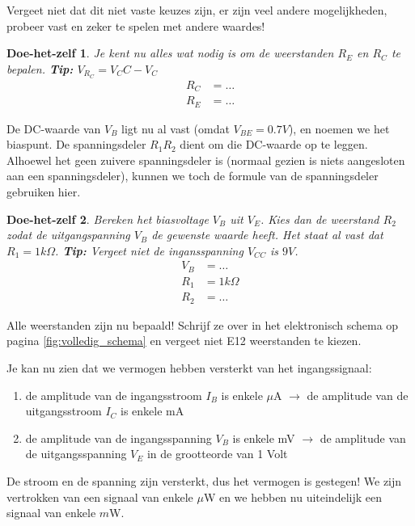 \documentclass{article}
\newtheorem{DIY}{Doe-het-zelf}
\begin{document}
				Vergeet niet dat dit niet vaste keuzes zijn, er zijn veel andere mogelijkheden, probeer vast en zeker te spelen met andere waardes!

				\begin{DIY} Je kent nu alles wat nodig is om de weerstanden $R_{E}$ en $ R_{C}$ te bepalen. \textbf{Tip:} $V_{R_C} = V_CC - V_C$
				\begin{align}
				    R_C &= \ldots \\
				    R_E &= \ldots
				\end{align}
				\end{DIY}				

				De DC-waarde van $V_B$ ligt nu al vast (omdat $V_{BE} = 0.7V$), en noemen we het biaspunt. De spanningsdeler $R_1R_2$ dient om die DC-waarde op te leggen. Alhoewel het geen zuivere spanningsdeler is (normaal gezien is niets aangesloten aan een spanningsdeler), kunnen we toch de formule van de spanningsdeler gebruiken hier.

				\begin{DIY} Bereken het biasvoltage $V_B$ uit $V_E$. Kies dan de weerstand $R_2$ zodat de uitgangspanning $V_B$ de gewenste waarde heeft. Het staat al vast dat $R_1 = 1k\Omega$. \textbf{Tip:} Vergeet niet de ingansspanning $V_{CC}$ is $9V$.
				\begin{align}
					V_B &= \ldots \\
				    R_1 &= 1k\Omega \\
				    R_2 &= \ldots
				\end{align}
				\end{DIY}

				Alle weerstanden zijn nu bepaald! Schrijf ze over in het elektronisch schema op pagina \ref{fig:volledig_schema} en vergeet niet E12 weerstanden te kiezen.

				Je kan nu zien dat we vermogen hebben versterkt van het ingangssignaal:
				\begin{enumerate}
				 	\item de amplitude van de ingangsstroom $I_B$ is enkele $\mu$A $\rightarrow$ de amplitude van de uitgangsstroom $I_C$ is enkele mA
				 	\item de amplitude van de ingangsspanning $V_B$ is enkele mV $\rightarrow$ de amplitude van de uitgangsspanning $V_E$ in de grootteorde van 1 Volt
				 \end{enumerate} 

				 De stroom en de spanning zijn versterkt, dus het vermogen is gestegen! We zijn vertrokken van een signaal van enkele $\mu$W en we hebben nu uiteindelijk een signaal van enkele $m$W. 
\end{document}
